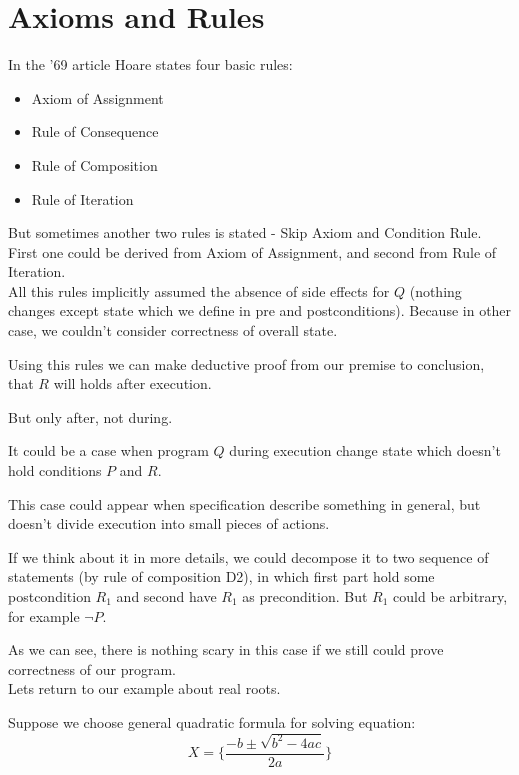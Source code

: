 \documentclass[twoside,twocolumn]{article}
\begin{document}

\section{Axioms and Rules}

In the '69 article Hoare states four basic rules:
\begin{itemize}
\item
  Axiom of Assignment
\item
  Rule of Consequence
\item
  Rule of Composition
\item
  Rule of Iteration
\end{itemize}
But sometimes another two rules is stated - Skip Axiom and Condition Rule. First
one could be derived from Axiom of Assignment, and second from Rule of
Iteration.\\

All this rules implicitly assumed the absence of side effects for $Q$ (nothing
changes except state which we define in pre and postconditions). Because in
other case, we couldn't consider correctness of overall state. 

Using this rules we can make deductive proof from our premise to conclusion,
that $R$ will holds after execution. 

But only after, not during.

It could be a case when program $Q$ during execution
change state which doesn't hold conditions $P$ and $R$.

This case could appear when specification describe something in general, but
doesn't divide execution into small pieces of actions.

If we think about it in more details, we could decompose it to two sequence of
statements (by rule of composition D2), in which first part hold some postcondition
$R_1$ and second have $R_1$ as precondition. But $R_1$ could be arbitrary, for example
$\neg P$.

As we can see, there is nothing scary in this case if we still could prove
correctness of our program. \\

Lets return to our example about real roots.

Suppose we choose general quadratic formula for solving equation:
\begin{equation}
 X = \Big\{ \frac{-b \pm \sqrt{b^2 - 4ac}}{2a} \Big\}
\end{equation}
\end{document}
